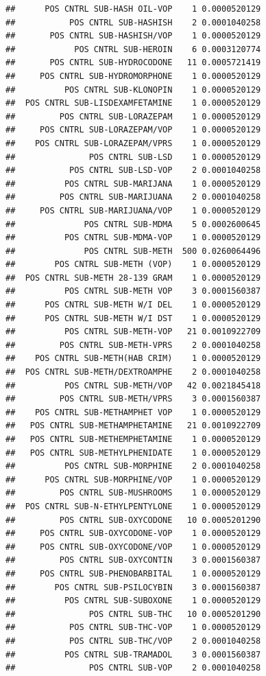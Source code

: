 \documentclass[]{book}
\begin{document}
\begin{verbatim}
##      POS CNTRL SUB-HASH OIL-VOP    1 0.0000520129
##           POS CNTRL SUB-HASHISH    2 0.0001040258
##       POS CNTRL SUB-HASHISH/VOP    1 0.0000520129
##            POS CNTRL SUB-HEROIN    6 0.0003120774
##       POS CNTRL SUB-HYDROCODONE   11 0.0005721419
##     POS CNTRL SUB-HYDROMORPHONE    1 0.0000520129
##          POS CNTRL SUB-KLONOPIN    1 0.0000520129
##  POS CNTRL SUB-LISDEXAMFETAMINE    1 0.0000520129
##         POS CNTRL SUB-LORAZEPAM    1 0.0000520129
##     POS CNTRL SUB-LORAZEPAM/VOP    1 0.0000520129
##    POS CNTRL SUB-LORAZEPAM/VPRS    1 0.0000520129
##               POS CNTRL SUB-LSD    1 0.0000520129
##           POS CNTRL SUB-LSD-VOP    2 0.0001040258
##          POS CNTRL SUB-MARIJANA    1 0.0000520129
##         POS CNTRL SUB-MARIJUANA    2 0.0001040258
##     POS CNTRL SUB-MARIJUANA/VOP    1 0.0000520129
##              POS CNTRL SUB-MDMA    5 0.0002600645
##          POS CNTRL SUB-MDMA-VOP    1 0.0000520129
##              POS CNTRL SUB-METH  500 0.0260064496
##        POS CNTRL SUB-METH (VOP)    1 0.0000520129
##  POS CNTRL SUB-METH 28-139 GRAM    1 0.0000520129
##          POS CNTRL SUB-METH VOP    3 0.0001560387
##      POS CNTRL SUB-METH W/I DEL    1 0.0000520129
##      POS CNTRL SUB-METH W/I DST    1 0.0000520129
##          POS CNTRL SUB-METH-VOP   21 0.0010922709
##         POS CNTRL SUB-METH-VPRS    2 0.0001040258
##    POS CNTRL SUB-METH(HAB CRIM)    1 0.0000520129
##  POS CNTRL SUB-METH/DEXTROAMPHE    2 0.0001040258
##          POS CNTRL SUB-METH/VOP   42 0.0021845418
##         POS CNTRL SUB-METH/VPRS    3 0.0001560387
##    POS CNTRL SUB-METHAMPHET VOP    1 0.0000520129
##   POS CNTRL SUB-METHAMPHETAMINE   21 0.0010922709
##   POS CNTRL SUB-METHEMPHETAMINE    1 0.0000520129
##   POS CNTRL SUB-METHYLPHENIDATE    1 0.0000520129
##          POS CNTRL SUB-MORPHINE    2 0.0001040258
##      POS CNTRL SUB-MORPHINE/VOP    1 0.0000520129
##         POS CNTRL SUB-MUSHROOMS    1 0.0000520129
##  POS CNTRL SUB-N-ETHYLPENTYLONE    1 0.0000520129
##         POS CNTRL SUB-OXYCODONE   10 0.0005201290
##     POS CNTRL SUB-OXYCODONE-VOP    1 0.0000520129
##     POS CNTRL SUB-OXYCODONE/VOP    1 0.0000520129
##         POS CNTRL SUB-OXYCONTIN    3 0.0001560387
##     POS CNTRL SUB-PHENOBARBITAL    1 0.0000520129
##        POS CNTRL SUB-PSILOCYBIN    3 0.0001560387
##          POS CNTRL SUB-SUBOXONE    1 0.0000520129
##               POS CNTRL SUB-THC   10 0.0005201290
##           POS CNTRL SUB-THC-VOP    1 0.0000520129
##           POS CNTRL SUB-THC/VOP    2 0.0001040258
##          POS CNTRL SUB-TRAMADOL    3 0.0001560387
##               POS CNTRL SUB-VOP    2 0.0001040258

\end{verbatim}
\end{document}
